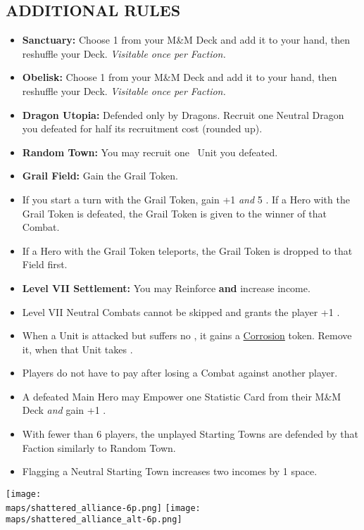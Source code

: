 \begin{multicols*}{2}
\subsection*{\MakeUppercase{Additional Rules}}
\begin{itemize}
  \item \textbf{Sanctuary:} Choose 1  from your M\&M Deck and add it to your hand, then reshuffle your Deck. \textit{Visitable once per Faction.}
  \item \textbf{Obelisk:} Choose 1  from your M\&M Deck and add it to your hand, then reshuffle your Deck. \textit{Visitable once per Faction.}
  \item \textbf{Dragon Utopia:} Defended only by Dragons. Recruit one Neutral Dragon you defeated for half its recruitment cost (rounded up).
  \item \textbf{Random Town:} You may recruit one \silver\ Unit you defeated.
  \item \textbf{Grail Field:} Gain the Grail Token.
  \item If you start a turn with the Grail Token, gain +1  \textit{and} 5 . If a Hero with the Grail Token is defeated, the Grail Token is given to the winner of that Combat.
  \item If a Hero with the Grail Token teleports, the Grail Token is dropped to that Field first.
  \item \textbf{Level VII Settlement:} You may Reinforce \textbf{and} increase income.
  \item Level VII Neutral Combats cannot be skipped and grants the player +1 .
  \item When a Unit is attacked but suffers no , it gains a \href{https://archon-studio.com/files/manuals/homm/HoMM-Stronghold-Mission-Book-Beta_EN.pdf}{Corrosion} token. Remove it, when that Unit takes .
\item Players do not have to pay  after losing a Combat against another player.
  \item A defeated Main Hero may Empower one Statistic Card from their M\&M Deck \textit{and} gain +1 .
  \item With fewer than 6 players, the unplayed Starting Towns are defended by that Faction similarly to Random Town.
  \item Flagging a Neutral Starting Town increases two incomes by 1 space.
\end{itemize}

\begin{center}
  \vfill
  \texttt{[image: \\maps/shattered\_alliance-6p.png]}
  \vfill
  \texttt{[image: \\maps/shattered\_alliance\_alt-6p.png]}
\end{center}

\end{multicols*}
